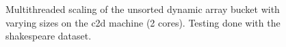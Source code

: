 \begin{landscape}
\begin{figure}[!h]
{        }
        \label{fig:ts_c2d_shake_unsorted}
        \caption{Multithreaded scaling of the unsorted dynamic array bucket with varying sizes on the
        c2d machine (2 cores). Testing done with the shakespeare dataset.}
    \end{figure}
    \begin{figure}[!h]
\end{figure}
\end{landscape}
